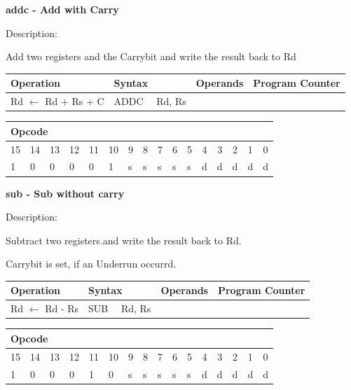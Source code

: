 \documentclass[%
	pdftex,
	a4paper,
	oneside,
	bibtotoc,%
	idxtotoc,%
	bibtotocnumbered,
	halfparskip,%
]{scrbook}
\begin{document}
\bigskip

\textbf{addc - Add with Carry}

Description:

Add two registers and the Carrybit and write the result back to Rd

\begin{tabular}{|l|l|l|l|}
\hline
Operation & Syntax & Operands & Program Counter \\ \hline
Rd $\leftarrow $ Rd + Rs + C & ADDC \ \ Rd, Rs &  &  \\ \hline
\end{tabular}

\begin{tabular}{|c|c|c|c|c|c|c|c|c|c|c|c|c|c|c|c|}
\hline
\multicolumn{6}{|l|}{Opcode} & \multicolumn{5}{|l|}{} & \multicolumn{5}{|l|}{
} \\ \hline
15 & 14 & 13 & 12 & 11 & 10 & 9 & 8 & 7 & 6 & 5 & 4 & 3 & 2 & 1 & 0 \\ \hline
\multicolumn{1}{|l|}{1} & \multicolumn{1}{|l|}{0} & \multicolumn{1}{|l|}{0}
& \multicolumn{1}{|l|}{0} & \multicolumn{1}{|l|}{0} & \multicolumn{1}{|l|}{1}
& \multicolumn{1}{|l|}{s} & \multicolumn{1}{|l|}{s} & \multicolumn{1}{|l|}{s}
& \multicolumn{1}{|l|}{s} & \multicolumn{1}{|l|}{s} & \multicolumn{1}{|l|}{d}
& \multicolumn{1}{|l|}{d} & \multicolumn{1}{|l|}{d} & \multicolumn{1}{|l|}{d}
& \multicolumn{1}{|l|}{d} \\ \hline
\end{tabular}

\bigskip

\textbf{sub - Sub without carry}

Description:

Subtract two registers.and write the result back to Rd.

Carrybit is set, if an Underrun occurrd.

\begin{tabular}{|l|l|l|l|}
\hline
Operation & Syntax & Operands & Program Counter \\ \hline
Rd $\leftarrow $ Rd - Rs & SUB \ \ Rd, Rs &  &  \\ \hline
\end{tabular}

\begin{tabular}{|c|c|c|c|c|c|c|c|c|c|c|c|c|c|c|c|}
\hline
\multicolumn{6}{|l|}{Opcode} & \multicolumn{5}{|l|}{} & \multicolumn{5}{|l|}{
} \\ \hline
15 & 14 & 13 & 12 & 11 & 10 & 9 & 8 & 7 & 6 & 5 & 4 & 3 & 2 & 1 & 0 \\ \hline
\multicolumn{1}{|l|}{1} & \multicolumn{1}{|l|}{0} & \multicolumn{1}{|l|}{0}
& \multicolumn{1}{|l|}{0} & \multicolumn{1}{|l|}{1} & \multicolumn{1}{|l|}{0}
& \multicolumn{1}{|l|}{s} & \multicolumn{1}{|l|}{s} & \multicolumn{1}{|l|}{s}
& \multicolumn{1}{|l|}{s} & \multicolumn{1}{|l|}{s} & \multicolumn{1}{|l|}{d}
& \multicolumn{1}{|l|}{d} & \multicolumn{1}{|l|}{d} & \multicolumn{1}{|l|}{d}
& \multicolumn{1}{|l|}{d} \\ \hline
\end{tabular}
\end{document}
